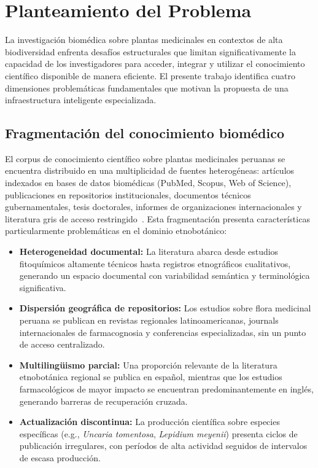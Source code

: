 
\section{Planteamiento del Problema}
\label{sec:problem_statement}

La investigación biomédica sobre plantas medicinales en contextos de alta biodiversidad enfrenta desafíos estructurales que limitan significativamente la capacidad de los investigadores para acceder, integrar y utilizar el conocimiento científico disponible de manera eficiente. El presente trabajo identifica cuatro dimensiones problemáticas fundamentales que motivan la propuesta de una infraestructura inteligente especializada.

\subsection{Fragmentación del conocimiento biomédico}
\label{subsec:fragmentation}

El corpus de conocimiento científico sobre plantas medicinales peruanas se encuentra distribuido en una multiplicidad de fuentes heterogéneas: artículos indexados en bases de datos biomédicas (PubMed, Scopus, Web of Science), publicaciones en repositorios institucionales, documentos técnicos gubernamentales, tesis doctorales, informes de organizaciones internacionales y literatura gris de acceso restringido~\cite{bussmann2015toxicity}. Esta fragmentación presenta características particularmente problemáticas en el dominio etnobotánico:

\begin{itemize}[leftmargin=*]
  \item \textbf{Heterogeneidad documental:} La literatura abarca desde estudios fitoquímicos altamente técnicos hasta registros etnográficos cualitativos, generando un espacio documental con variabilidad semántica y terminológica significativa.

  \item \textbf{Dispersión geográfica de repositorios:} Los estudios sobre flora medicinal peruana se publican en revistas regionales latinoamericanas, journals internacionales de farmacognosia y conferencias especializadas, sin un punto de acceso centralizado.

  \item \textbf{Multilingüismo parcial:} Una proporción relevante de la literatura etnobotánica regional se publica en español, mientras que los estudios farmacológicos de mayor impacto se encuentran predominantemente en inglés, generando barreras de recuperación cruzada.

  \item \textbf{Actualización discontinua:} La producción científica sobre especies específicas (e.g., \textit{Uncaria tomentosa}, \textit{Lepidium meyenii}) presenta ciclos de publicación irregulares, con períodos de alta actividad seguidos de intervalos de escasa producción.
\end{itemize}

